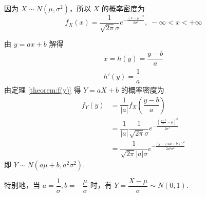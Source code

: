 \begin{myproof}
    因为 $X \sim N(\mu,\sigma^2)$，所以 $X$ 的概率密度为
    $$
    f_{X}(x) = \dfrac{1}{\sqrt{2\pi} \sigma} e^{-\frac{(x-\mu)^2}{2\sigma^2}}, \; -\infty < x < +\infty
    $$

    由 $y=ax+b$ 解得
    \begin{gather*}
        x = h(y) = \dfrac{y-b}{a} \\
        h'(y) = \dfrac{1}{a}
    \end{gather*}
    由定理 \ref{theorem:f(y)} 得 $Y=aX+b$ 的概率密度为
    $$
    \begin{aligned}
        f_{Y}(y) &= \dfrac{1}{|a|} f_{X}(\dfrac{y-b}{a}) \\
        &= \dfrac{1}{|a|} \dfrac{1}{\sqrt{2\pi}\sigma} e^{-\frac{\left( \frac{y-b}{a}-\mu \right)^2}{2\sigma^2}}\\
        &= \dfrac{1}{\sqrt{2\pi}|a|\sigma} e^{-\frac{[y-(a\mu+b)]^2}{2 a^2 \sigma^2}}
    \end{aligned}
    $$
    即 $Y \sim N(a \mu + b, a^2 \sigma^2)$.
\end{myproof}

特别地，当 $a = \dfrac{1}{\sigma}, b=-\dfrac{\mu}{\sigma}$ 时，有 $Y=\dfrac{X-\mu}{\sigma} \sim N(0,1)$.